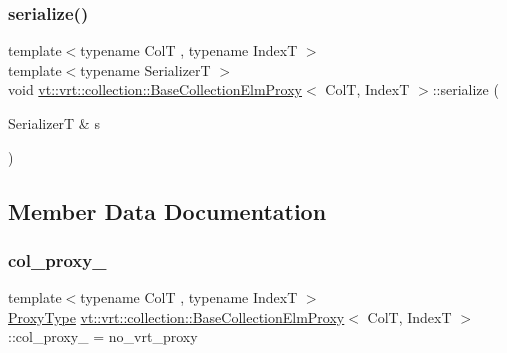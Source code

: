 \mbox{\label{structvt_1_1vrt_1_1collection_1_1_base_collection_elm_proxy_ac49c4e9d158a3d3c874f1dcfb5a8505c}} 
\subsubsection{\texorpdfstring{serialize()}{serialize()}}
{\footnotesize\ttfamily template$<$typename ColT , typename IndexT $>$ \\
template$<$typename SerializerT $>$ \\
void \hyperlink{structvt_1_1vrt_1_1collection_1_1_base_collection_elm_proxy}{vt\+::vrt\+::collection\+::\+Base\+Collection\+Elm\+Proxy}$<$ ColT, IndexT $>$\+::serialize (\begin{DoxyParamCaption}\item[{SerializerT \&}]{s }\end{DoxyParamCaption})}



\subsection{Member Data Documentation}
\mbox{\label{structvt_1_1vrt_1_1collection_1_1_base_collection_elm_proxy_a6613b91da1dbba1f1aa220ac684dfe84}} 
\subsubsection{\texorpdfstring{col\+\_\+proxy\+\_\+}{col\_proxy\_}}
{\footnotesize\ttfamily template$<$typename ColT , typename IndexT $>$ \\
\hyperlink{structvt_1_1vrt_1_1collection_1_1_base_collection_elm_proxy_af80f1576659b626a30828c6d85eca926}{Proxy\+Type} \hyperlink{structvt_1_1vrt_1_1collection_1_1_base_collection_elm_proxy}{vt\+::vrt\+::collection\+::\+Base\+Collection\+Elm\+Proxy}$<$ ColT, IndexT $>$\+::col\+\_\+proxy\+\_\+ = no\+\_\+vrt\+\_\+proxy\hspace{0.3cm}{\ttfamily [protected]}}

